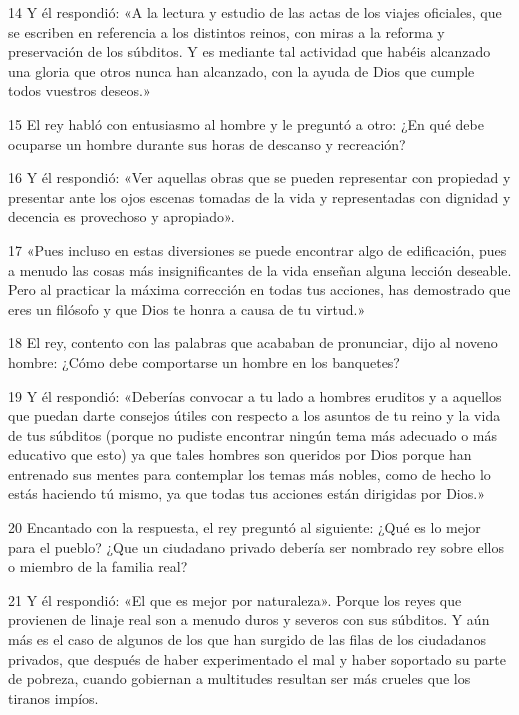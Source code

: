 \par 14 Y él respondió: «A la lectura y estudio de las actas de los viajes oficiales, que se escriben en referencia a los distintos reinos, con miras a la reforma y preservación de los súbditos. Y es mediante tal actividad que habéis alcanzado una gloria que otros nunca han alcanzado, con la ayuda de Dios que cumple todos vuestros deseos.»

\par 15 El rey habló con entusiasmo al hombre y le preguntó a otro: ¿En qué debe ocuparse un hombre durante sus horas de descanso y recreación?

\par 16 Y él respondió: «Ver aquellas obras que se pueden representar con propiedad y presentar ante los ojos escenas tomadas de la vida y representadas con dignidad y decencia es provechoso y apropiado».

\par 17 «Pues incluso en estas diversiones se puede encontrar algo de edificación, pues a menudo las cosas más insignificantes de la vida enseñan alguna lección deseable. Pero al practicar la máxima corrección en todas tus acciones, has demostrado que eres un filósofo y que Dios te honra a causa de tu virtud.»

\par 18 El rey, contento con las palabras que acababan de pronunciar, dijo al noveno hombre: ¿Cómo debe comportarse un hombre en los banquetes?

\par 19 Y él respondió: «Deberías convocar a tu lado a hombres eruditos y a aquellos que puedan darte consejos útiles con respecto a los asuntos de tu reino y la vida de tus súbditos (porque no pudiste encontrar ningún tema más adecuado o más educativo que esto) ya que tales hombres son queridos por Dios porque han entrenado sus mentes para contemplar los temas más nobles, como de hecho lo estás haciendo tú mismo, ya que todas tus acciones están dirigidas por Dios.»

\par 20 Encantado con la respuesta, el rey preguntó al siguiente: ¿Qué es lo mejor para el pueblo? ¿Que un ciudadano privado debería ser nombrado rey sobre ellos o miembro de la familia real?

\par 21 Y él respondió: «El que es mejor por naturaleza». Porque los reyes que provienen de linaje real son a menudo duros y severos con sus súbditos. Y aún más es el caso de algunos de los que han surgido de las filas de los ciudadanos privados, que después de haber experimentado el mal y haber soportado su parte de pobreza, cuando gobiernan a multitudes resultan ser más crueles que los tiranos impíos.

